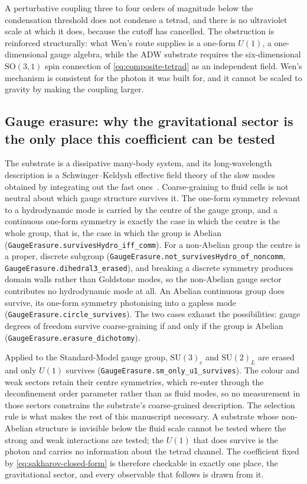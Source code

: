 \documentclass[aps,prd,nofootinbib,superscriptaddress,12pt]{revtex4-2}
\DeclareRobustCommand{\lb}{\discretionary{}{}{}}
\begin{document}
A perturbative coupling three to four orders of magnitude below the
condensation threshold does not condense a tetrad, and there is no
ultraviolet scale at which it does, because the cutoff has cancelled. The
obstruction is reinforced structurally: what Wen's route supplies is a
one-form $U(1)$, a one-dimensional gauge algebra, while the ADW substrate
requires the six-dimensional $\mathrm{SO}(3,1)$ spin connection of
\eqref{eq:composite-tetrad} as an independent field. Wen's mechanism is
consistent for the photon it was built for, and it cannot be scaled to
gravity by making the coupling larger.

\subsection*{Gauge erasure: why the gravitational sector is the only place this coefficient can be tested}

The substrate is a dissipative many-body system, and its long-wavelength
description is a Schwinger--Keldysh effective field theory of the slow
modes obtained by integrating out the fast ones~\cite{GloriosoLiu2018}.
Coarse-graining to fluid cells is not neutral about which gauge structure
survives it. The one-form symmetry relevant to a hydrodynamic mode is
carried by the centre of the gauge group, and a continuous one-form
symmetry is exactly the case in which the centre is the whole group, that
is, the case in which the group is Abelian
(\texttt{Gauge\lb{}Erasure.\lb{}survives\lb{}Hydro\_\lb{}iff\_\lb{}comm}). For a non-Abelian group
the centre is a proper, discrete subgroup
(\texttt{Gauge\lb{}Erasure.\lb{}not\_\lb{}survives\lb{}Hydro\_\lb{}of\_\lb{}noncomm},
\texttt{Gauge\lb{}Erasure.\lb{}dihedral3\_\lb{}erased}), and breaking a discrete symmetry
produces domain walls rather than Goldstone modes, so the non-Abelian gauge
sector contributes no hydrodynamic mode at all. An Abelian continuous group
does survive, its one-form symmetry photonising into a gapless mode
(\texttt{Gauge\lb{}Erasure.\lb{}circle\_\lb{}survives}). The two cases exhaust the
possibilities: gauge degrees of freedom survive coarse-graining if and only
if the group is Abelian (\texttt{Gauge\lb{}Erasure.\lb{}erasure\_\lb{}dichotomy}).

Applied to the Standard-Model gauge group, $\mathrm{SU}(3)_c$ and
$\mathrm{SU}(2)_L$ are erased and only $U(1)$ survives
(\texttt{Gauge\lb{}Erasure.\lb{}sm\_\lb{}only\_\lb{}u1\_\lb{}survives}). The colour and weak sectors
retain their centre symmetries, which re-enter through the deconfinement
order parameter rather than as fluid modes, so no measurement in those
sectors constrains the substrate's coarse-grained description. The
selection rule is what makes the rest of this manuscript necessary. A
substrate whose non-Abelian structure is invisible below the fluid scale
cannot be tested where the strong and weak interactions are tested; the
$U(1)$ that does survive is the photon and carries no information about the
tetrad channel. The coefficient fixed by \eqref{eq:sakharov-closed-form}
is therefore checkable in exactly one place, the gravitational sector, and
every observable that follows is drawn from it.
\end{document}
